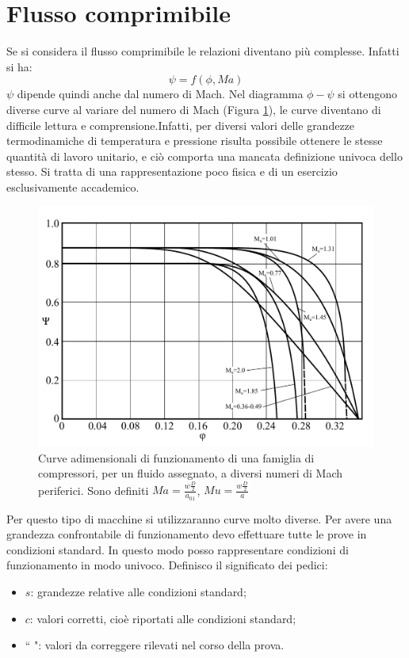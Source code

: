 \section{Flusso comprimibile}
Se si considera il flusso comprimibile le relazioni diventano più complesse. Infatti si ha:
\begin{equation}
\psi=f(\phi,Ma)
\end{equation}
$\psi$ dipende quindi anche dal numero di Mach. 
Nel diagramma $\phi-\psi$ si ottengono diverse curve al variare del numero di Mach (Figura \ref{fig:ComprMach}), le curve diventano di difficile lettura e comprensione.Infatti, per diversi valori delle grandezze termodinamiche di temperatura e pressione risulta possibile ottenere le stesse quantità di lavoro unitario, e ciò comporta una mancata definizione univoca dello stesso. Si tratta di una rappresentazione poco fisica e di un esercizio esclusivamente accademico.
\begin{figure}[h!]
\centering
  \includegraphics[width=.85\textwidth]{fig/ComprMach.pdf}
\caption{Curve adimensionali di funzionamento di una famiglia di compressori, per un fluido assegnato, a diversi numeri di Mach periferici. Sono definiti $Ma = \frac{w \frac{D}{2}}{a_{01}}$, $Mu = \frac{w \frac{D}{2}}{a}$}
\label{fig:ComprMach}
\end{figure}
Per questo tipo di macchine si utilizzaranno curve molto diverse. Per avere una grandezza confrontabile di funzionamento devo effettuare tutte le prove in condizioni standard. In questo modo posso rappresentare condizioni di funzionamento in modo univoco. 
Definisco il significato dei pedici:
\begin{itemize}
\item $s$: grandezze relative alle condizioni standard;
\item $c$: valori corretti, cioè riportati alle condizioni standard;
\item ``  ": valori da correggere rilevati nel corso della prova.
\end{itemize}
